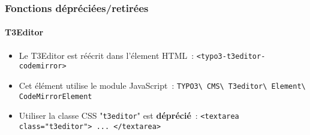 %

\begin{frame}[fragile]
	\frametitle{Fonctions dépréciées/retirées}
	\framesubtitle{T3Editor}

	\begin{itemize}
		\item Le T3Editor est réécrit dans l'élement HTML~:\newline
			\smaller\texttt{<typo3-t3editor-codemirror>}\normalsize

		\item Cet élément utilise le module JavaScript~:\newline
			\small
				\texttt{TYPO3\textbackslash
					CMS\textbackslash
					T3editor\textbackslash
					Element\textbackslash
					CodeMirrorElement}
			\normalsize

		\item Utiliser la classe CSS "\texttt{t3editor}" est \textbf{déprécié}~:\newline
			\smaller\texttt{<textarea class="t3editor"> ... </textarea>}\normalsize

	\end{itemize}

\end{frame}

